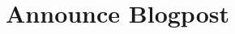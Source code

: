 \documentclass[11pt]{book}
\title{Announce Blogpost}
\author{}
\begin{document}
\maketitle
\def\title#1{\chapter{#1}}
\tableofcontents

        
        
\end{document}
